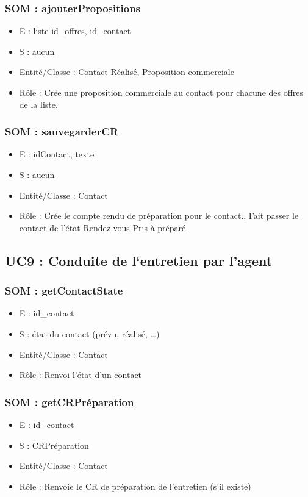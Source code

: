 \subsubsection{SOM : ajouterPropositions}
	\begin{itemize}
		\item E : liste id\_offres, id\_contact
		\item S : aucun
		\item Entité/Classe : Contact Réalisé, Proposition commerciale
		\item Rôle : Crée une proposition commerciale au contact pour chacune des offres de la
	liste.
	\end{itemize}

\subsubsection{SOM : sauvegarderCR}
	\begin{itemize}
		\item E : idContact, texte
		\item S : aucun
		\item Entité/Classe : Contact
		\item Rôle : Crée le compte rendu de préparation pour le contact., Fait passer le contact
	de l’état Rendez-vous Pris à préparé.
	\end{itemize}



\subsection{UC9 : Conduite de l‘entretien par l’agent}
\subsubsection{SOM : getContactState}
	\begin{itemize}
		\item E : id\_contact
		\item S : état du contact (prévu, réalisé, …)
		\item Entité/Classe : Contact
		\item Rôle : Renvoi l’état d’un contact
	\end{itemize}

\subsubsection{SOM : getCRPréparation}
	\begin{itemize}
		\item E : id\_contact
		\item S : CRPréparation
		\item Entité/Classe : Contact
		\item Rôle : Renvoie le CR de préparation de l’entretien (s’il existe)
	\end{itemize}

